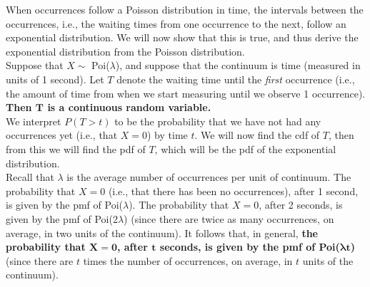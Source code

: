 \noindent When occurrences follow a Poisson distribution in time, the intervals between the occurrences, i.e., the waiting times from one occurrence to the next, follow an exponential distribution. We will now show that this is true, and thus derive the exponential distribution from the Poisson distribution. \\

\noindent Suppose that $X \sim$ Poi($\lambda$), and suppose that the continuum is time (measured in units of 1 second). Let $T$ denote the waiting time until the \textit{first} occurrence (i.e., the amount of time from when we start measuring until we observe 1 occurrence). \textbf{Then $\boldsymbol{T}$ is a continuous random variable.} \\

\noindent We interpret $P(T > t)$ to be the probability that we have not had any occurrences yet (i.e., that $X = 0$) by time $t$. We will now find the cdf of $T$, then from this we will find the pdf of $T$, which will be the pdf of the exponential distribution. \\

\noindent Recall that $\lambda$ is the average number of occurrences per unit of continuum. The probability that $X = 0$ (i.e., that there has been no occurrences), after 1 second, is given by the pmf of Poi($\lambda$). The probability that $X = 0$, after 2 seconds, is given by the pmf of Poi(2$\lambda$) (since there are twice as many occurrences, on average, in two units of the continuum). It follows that, in general, \textbf{the probability that $\boldsymbol{X = 0}$, after $\boldsymbol{t}$ seconds, is given by the pmf of Poi($\boldsymbol{\lambda t}$)} (since there are $t$ times the number of occurrences, on average, in $t$ units of the continuum). \\

